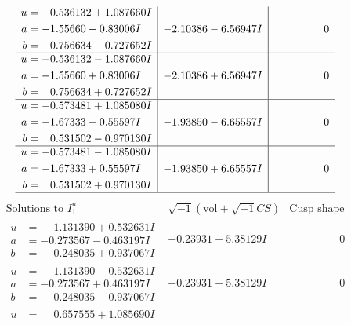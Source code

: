 \documentclass[1p]{elsarticle_modified}
\theoremstyle{definition}
\newcommand{\I}{\sqrt{-1}}
\begin{document}
$$\begin{array}{c|c|c}
\begin{aligned}
u &= -0.536132 + 1.087660 I \\
a &= -1.55660 - 0.83006 I \\
b &= \phantom{-}0.756634 - 0.727652 I\end{aligned}
 & -2.10386 - 6.56947 I & \phantom{-0.000000 } 0 \\ \hline\begin{aligned}
u &= -0.536132 - 1.087660 I \\
a &= -1.55660 + 0.83006 I \\
b &= \phantom{-}0.756634 + 0.727652 I\end{aligned}
 & -2.10386 + 6.56947 I & \phantom{-0.000000 } 0 \\ \hline\begin{aligned}
u &= -0.573481 + 1.085080 I \\
a &= -1.67333 - 0.55597 I \\
b &= \phantom{-}0.531502 - 0.970130 I\end{aligned}
 & -1.93850 - 6.65557 I & \phantom{-0.000000 } 0 \\ \hline\begin{aligned}
u &= -0.573481 - 1.085080 I \\
a &= -1.67333 + 0.55597 I \\
b &= \phantom{-}0.531502 + 0.970130 I\end{aligned}
 & -1.93850 + 6.65557 I & \phantom{-0.000000 } 0\\
 \hline 
 \end{array}$$\newpage$$\begin{array}{c|c|c}  
\text{Solutions to }I^u_{1}& \I (\text{vol} + \sqrt{-1}CS) & \text{Cusp shape}\\
 \hline 
\begin{aligned}
u &= \phantom{-}1.131390 + 0.532631 I \\
a &= -0.273567 - 0.463197 I \\
b &= \phantom{-}0.248035 + 0.937067 I\end{aligned}
 & -0.23931 + 5.38129 I & \phantom{-0.000000 } 0 \\ \hline\begin{aligned}
u &= \phantom{-}1.131390 - 0.532631 I \\
a &= -0.273567 + 0.463197 I \\
b &= \phantom{-}0.248035 - 0.937067 I\end{aligned}
 & -0.23931 - 5.38129 I & \phantom{-0.000000 } 0 \\ \hline\begin{aligned}
u &= \phantom{-}0.657555 + 1.085690 I \\

\end{aligned}
\end{array}$$
\end{document}
